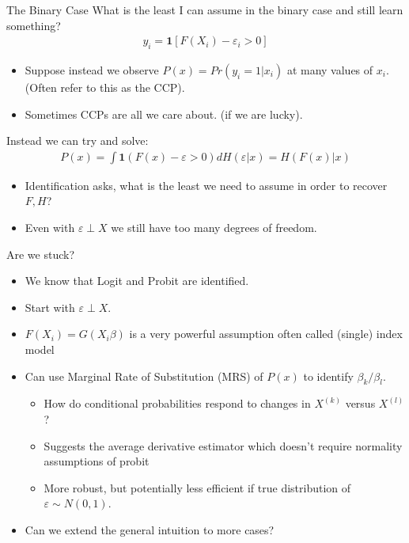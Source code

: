 \documentclass[11pt,handout,xcolor=pdftex,dvipsnames,table,mathserif]{beamer}
\begin{document}
\begin{frame}{The Binary Case}
What is the least I can assume in the binary case and still learn something?
\begin{eqnarray*}
y_i = \mathbf{1}[F(X_i) - \varepsilon_i > 0]
\end{eqnarray*}
\begin{itemize}
\item Suppose instead we observe $P(x) = Pr(y_i = 1 | x_i)$ at many values of $x_i$. (Often refer to this as the CCP).
\item Sometimes CCPs are all we care about. (if we are lucky).
\end{itemize}
Instead we can try and solve:
\begin{eqnarray*}
P(x) = \int \mathbf{1}(F(x) - \varepsilon > 0) dH(\varepsilon | x) = H(F(x)| x)
\end{eqnarray*}
\begin{itemize}
\item Identification asks, what is the least we need to assume in order to recover $F,H$?
\item Even with $\varepsilon \perp X$ we still have too many degrees of freedom.
\end{itemize}
\end{frame}

\begin{frame}{Are we stuck?}

\begin{itemize}
\item We know that Logit and Probit are identified.
\item Start with $\varepsilon \perp X$.
\item $F(X_i) = G(X_i \beta)$ is a very powerful assumption often called \alert{(single) index model}
\item Can use Marginal Rate of Substitution (MRS) of $P(x)$ to identify $\beta_k / \beta_l$.
\begin{itemize}
\item How do conditional probabilities respond to changes in $X^{(k)}$ versus $X^{(l)}$?
\item Suggests the \alert{average derivative estimator} which doesn't require normality assumptions of probit
\item More robust, but potentially less efficient if true distribution of $\varepsilon \sim N(0,1)$.
\end{itemize}
\item Can we extend the general intuition to more cases?
\end{itemize}
\end{frame}
\end{document}
